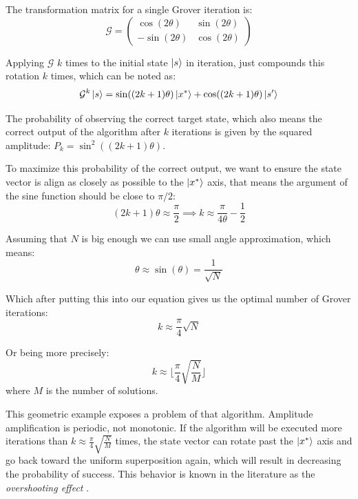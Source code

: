 \bigskip
The transformation matrix for a single Grover iteration is:
\bigskip
\begin{equation}
    \mathcal{G} = \begin{pmatrix} 
    \cos (2\theta) & \sin (2\theta) \\ 
    -\sin (2\theta) & \cos (2\theta) 
    \end{pmatrix}
\end{equation}
\bigskip
%
%

Applying $\mathcal{G}$ $k$ times to the initial state $\ket{s}$ in iteration, just compounds this rotation $k$ times, which can be noted as:
\bigskip
\begin{equation}
    \mathcal{G}^k \ket{s} = \sin((2k+1)\theta)\ket{x^*} + \cos((2k+1)\theta)\ket{s'}
\end{equation}
\bigskip
%
%

The probability of observing the correct target state, which also means the correct output of the algorithm after $k$ iterations is given 
by the squared amplitude: $P_k = \sin^2((2k+1)\theta)$. 
%
%

\bigskip
To maximize this probability of the correct output, we want to ensure the state vector is align as closely as possible to the $\ket{x^*}$ axis, 
that means the argument of the sine function should be close to $\pi/2$:
\bigskip
\begin{equation}
    (2k+1)\theta \approx \frac{\pi}{2} \implies k \approx \frac{\pi}{4\theta} - \frac{1}{2}
\end{equation}
\bigskip
%
%

Assuming that $N$ is big enough we can use small angle approximation, which means:
\bigskip
\begin{equation}
    \theta \approx \sin(\theta) = \frac{1}{\sqrt{N}}
\end{equation}
\bigskip
%
%

Which after putting this into our equation gives us the optimal number of Grover iterations:
\bigskip
\begin{equation}
    k \approx \frac{\pi}{4}\sqrt{N}
\end{equation}
\bigskip
%
%

Or being more precisely:
\bigskip
\begin{equation}
    k \approx \lfloor \frac{\pi}{4}\sqrt{\frac{N}{M}} \rfloor
\end{equation}
\bigskip
%
%
where $M$ is the number of solutions.

\bigskip
This geometric example exposes a problem of that algorithm. Amplitude amplification is periodic, not monotonic.
If the algorithm will be executed more iterations than $k \approx \frac{\pi}{4}\sqrt{\frac{N}{M}}$ times, 
the state vector can rotate past the $\ket{x^*}$ axis and go back toward the uniform superposition again, 
which will result in decreasing the probability of success. 
This behavior is known in the literature as the \textit{overshooting effect} \cite{boyer1998tight}. 
%
%

